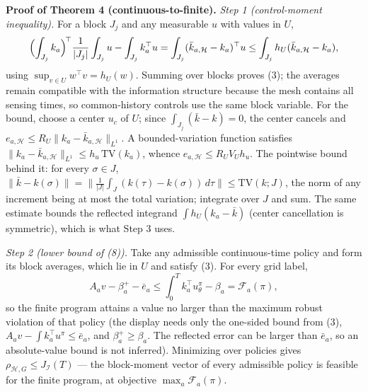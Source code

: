 \documentclass[10pt,article]{article}
\begin{document}
\textbf{Proof of Theorem 4 (continuous-to-finite).}
\emph{Step 1 (control-moment inequality).} For a block \(J_j\) and any
measurable \(u\) with values in \(U\),
\[
\Bigl(\int_{J_j} k_a\Bigr)^{\!\top} \frac{1}{|J_j|}\int_{J_j} u
- \int_{J_j} k_a^\top u
= \int_{J_j} (\bar k_{a,\mathcal H} - k_a)^\top u
\le \int_{J_j} h_U(\bar k_{a,\mathcal H} - k_a),
\]
using \(\sup_{v \in U} w^\top v = h_U(w)\). Summing over blocks proves (3);
the averages remain compatible with the information structure because the
mesh contains all sensing times, so common-history controls use the same
block variable. For the bound, choose a center \(u_c\) of \(U\); since
\(\int_{J_j}(\bar k - k) = 0\), the center cancels and
\(e_{a,\mathcal H} \le R_U \|k_a - \bar k_{a,\mathcal H}\|_{L^1}\). A
bounded-variation function satisfies \(\|k_a - \bar k_{a,\mathcal
H}\|_{L^1} \le h_u\, \mathrm{TV}(k_a)\), whence \(e_{a,\mathcal H} \le R_U
V_U h_u\). The pointwise bound behind it: for every \(\sigma \in J\),
\(\|\bar k - k(\sigma)\| = \bigl\|\tfrac{1}{|J|}\int_J (k(\tau) -
k(\sigma))\,d\tau\bigr\| \le \mathrm{TV}(k; J)\), the norm of any
increment being at most the total variation; integrate over \(J\) and
sum. The same estimate bounds the reflected integrand
\(\int h_U(k_a - \bar k)\) (center cancellation is symmetric), which
is what Step 3 uses.

\emph{Step 2 (lower bound of (8)).} Take any admissible continuous-time
policy and form its block averages, which lie in \(U\) and satisfy (3). For
every grid label,
\[
A_a v - \beta_a^{+} - \bar e_a \le \int_0^T k_a^\top u^\pi_\theta -
\beta_a = \mathcal F_a(\pi),
\]
so the finite program attains a value no larger than the maximum robust
violation of that policy (the display needs only the one-sided bound from (3),
\(A_a v - \int k_a^\top u^\pi \le \bar e_a\), and
\(\beta_a^{+} \ge \beta_a\). The reflected error can be larger
than \(\bar e_a\), so an absolute-value bound is not inferred). Minimizing over policies gives
\(\rho_{\mathcal H,G} \le J_{\mathcal I}(T)\) --- the block-moment
vector of every admissible policy is feasible for the finite program, at
objective \(\max_a \mathcal F_a(\pi)\).
\end{document}
